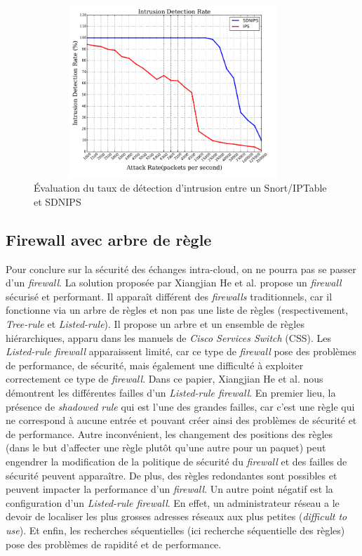 \begin{figure}[h]
	\center
	\includegraphics[height=6.5cm, width=10.5cm]{./pics/performance_SDNIPS.png}
	\caption{Évaluation du taux de détection d'intrusion entre un Snort/IPTable et SDNIPS \cite{sdnips}}
	\label{label-image10}
\end{figure}

\subsection{Firewall avec arbre de règle}
Pour conclure sur la sécurité des échanges intra-cloud, on ne pourra pas se passer d'un \textit{firewall}. La solution proposée par Xiangjian He et al. propose un \textit{firewall} sécurisé et performant. Il apparaît différent des \textit{firewalls} traditionnels, car il fonctionne via un arbre de règles et non pas une liste de règles (respectivement, \textit{Tree-rule} et \textit{Listed-rule}). Il propose un arbre et un ensemble de règles hiérarchiques, apparu dans les manuels de \textit{Cisco Services Switch} (CSS). Les \textit{Listed-rule firewall} apparaissent limité, car ce type de \textit{firewall} pose des problèmes de performance, de sécurité, mais également une difficulté à exploiter correctement ce type de \textit{firewall}. Dans ce papier, Xiangjian He et al. nous démontrent les différentes failles d'un \textit{Listed-rule firewall}. En premier lieu, la présence de \textit{shadowed rule} qui est l'une des grandes failles, car c'est une règle qui ne correspond à aucune entrée et pouvant créer ainsi des problèmes de sécurité et de performance. Autre inconvénient, les changement des positions des règles (dans le but d'affecter une règle plutôt qu'une autre pour un paquet) peut engendrer la modification de la politique de sécurité du \textit{firewall} et des failles de sécurité peuvent apparaître. De plus, des règles redondantes sont possibles et peuvent impacter la performance d'un \textit{firewall}. Un autre point négatif est la configuration d'un \textit{Listed-rule firewall}. En effet, un administrateur réseau a le devoir de localiser les plus grosses adresses réseaux aux plus petites (\textit{difficult to use}). Et enfin, les recherches séquentielles (ici recherche séquentielle des règles) pose des problèmes de rapidité et de performance.

